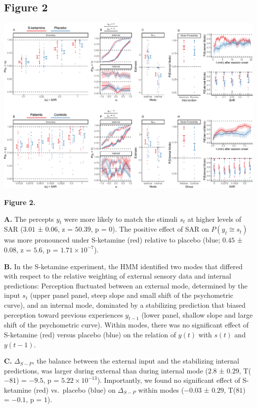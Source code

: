 \documentclass[
]{article}
\begin{document}
\newpage

\hypertarget{figure-2}{%
\subsection{Figure 2}\label{figure-2}}

\includegraphics{modes_ketamine_scz_files/figure-latex/rev_Figure_2-1b.pdf}

\textbf{Figure 2.}

\textbf{A.} The percepts \(y_t\) were more likely to match the stimuli
\(s_t\) at higher levels of SAR (\(3.01\) ± \(0.06\), z = \(50.39\), p =
\(0\)). The positive effect of SAR on \(P(y_t \cong s_t)\) was more
pronounced under S-ketamine (red) relative to placebo (blue; \(0.45\) ±
\(0.08\), z = \(5.6\), p = \(\ensuremath{1.71\times 10^{-7}}\)).

\textbf{B.} In the S-ketamine experiment, the HMM identified two modes
that differed with respect to the relative weighting of external sensory
data and internal predictions: Perception fluctuated between an external
mode, determined by the input \(s_t\) (upper panel panel, steep slope
and small shift of the psychometric curve), and an internal mode,
dominated by a stabilizing prediction that biased perception toward
previous experiences \(y_{t-1}\) (lower panel, shallow slope and large
shift of the psychometric curve). Within modes, there was no significant
effect of S-ketamine (red) versus placebo (blue) on the relation of
\(y(t)\) with \(s(t)\) and \(y(t-1)\).

\textbf{C.} \(\Delta_{S-P}\), the balance between the external input and
the stabilizing internal predictions, was larger during external than
during internal mode (\(2.8\) ± \(0.29\), T(\(-81\)) = \(-9.5\), p =
\(\ensuremath{5.22\times 10^{-13}}\)). Importantly, we found no
significant effect of S-ketamine (red) vs.~placebo (blue) on
\(\Delta_{S-P}\) within modes (\(-0.03\) ± \(0.29\), T(\(81\)) =
\(-0.1\), p = \(1\)).
\end{document}
